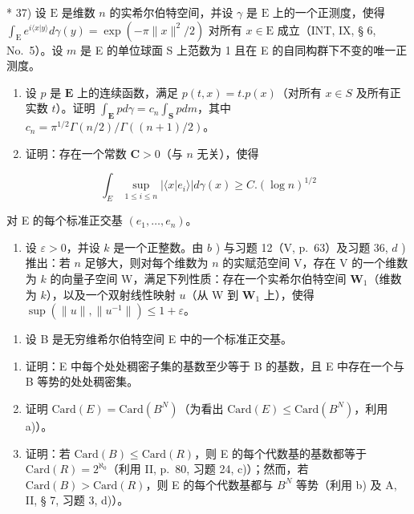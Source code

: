 * 37) 设 \(\mathrm{E}\) 是维数 \(n\) 的实希尔伯特空间，并设 \(\gamma\) 是 \(\mathrm{E}\) 上的一个正测度，使得 \(\int_{\mathrm{E}} e^{i\langle x|y\rangle} d\gamma(y) = \exp(-\pi \|x\|^2/2)\) 对所有 \(x \in \mathrm{E}\) 成立（INT, IX, § 6, No.~5）。设 \(m\) 是 E 的单位球面 S 上范数为 1 且在 E 的自同构群下不变的唯一正测度。

\begin{enumerate}
\def\labelenumi{\alph{enumi})}
\item
  设 \(p\) 是 \(\mathbf{E}\) 上的连续函数，满足 \(p(t,x) = t.p(x)\)（对所有 \(x\in S\) 及所有正实数 \(t\)）。证明 \(\int_{\mathbf{E}}pd\gamma = c_n\int_{\mathbf{S}}pdm\)，其中 \(c_{n} = \pi^{1 / 2}\Gamma (n / 2) / \Gamma ((n + 1) / 2)\)。
\item
  证明：存在一个常数 \(\mathbf{C} > 0\)（与 \(n\) 无关），使得
\end{enumerate}

\[
\int_ {E} \sup _ {1 \leqslant i \leqslant n} | \langle x | e _ {i} \rangle | d \gamma (x) \geqslant C. (\log n) ^ {1 / 2}
\]

对 E 的每个标准正交基 \((e_1, \dots, e_n)\)。

\begin{enumerate}
\def\labelenumi{\alph{enumi})}
\setcounter{enumi}{2}
\tightlist
\item
  设 \(\varepsilon > 0\)，并设 \(k\) 是一个正整数。由 \(b\) ) 与习题 12（V, p.~63）及习题 36, \(d\) ) 推出：若 \(n\) 足够大，则对每个维数为 \(n\) 的实赋范空间 V，存在 V 的一个维数为 \(k\) 的向量子空间 W，满足下列性质：存在一个实希尔伯特空间 \(\mathbf{W}_1\)（维数为 \(k\)），以及一个双射线性映射 \(u\)（从 W 到 \(\mathbf{W}_1\) 上），使得 \(\sup (\| u \|, \| u^{-1} \|) \leqslant 1 + \varepsilon\)。
\end{enumerate}

\exercisegroup

\begin{enumerate}
\def\labelenumi{\arabic{enumi})}
\tightlist
\item
  设 B 是无穷维希尔伯特空间 E 中的一个标准正交基。
\end{enumerate}

\begin{enumerate}
\def\labelenumi{\alph{enumi})}
\tightlist
\item
  证明：E 中每个处处稠密子集的基数至少等于 B 的基数，且 E 中存在一个与 B 等势的处处稠密集。
\item
  证明 \(\text{Card}(E) = \text{Card}(B^{N})\)（为看出 \(\text{Card}(E) \leqslant \text{Card}(B^{N})\)，利用 a)）。
\item
  证明：若 \(\text{Card}(B) \leqslant \text{Card}(R)\)，则 E 的每个代数基的基数都等于 \(\text{Card}(R) = 2^{\aleph_{0}}\)（利用 II, p.~80, 习题 24, c)）；然而，若 \(\text{Card}(B) > \text{Card}(R)\)，则 E 的每个代数基都与 \(B^{N}\) 等势（利用 b) 及 A, II, § 7, 习题 3, d)）。
\end{enumerate}

